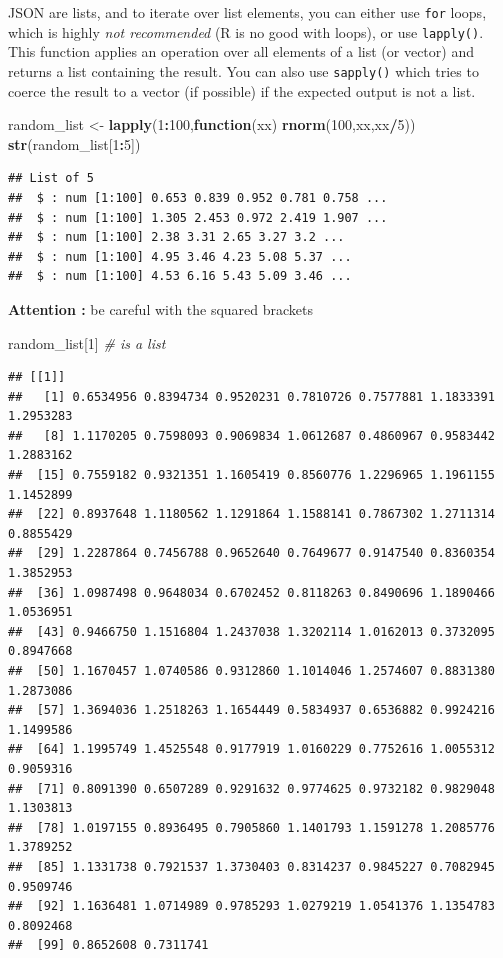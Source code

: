 \documentclass[
]{book}
\newenvironment{Shaded}{\begin{snugshade}}{\end{snugshade}}
\newcommand{\CommentTok}[1]{\textcolor[rgb]{0.56,0.35,0.01}{\textit{#1}}}
\newcommand{\ControlFlowTok}[1]{\textcolor[rgb]{0.13,0.29,0.53}{\textbf{#1}}}
\newcommand{\DecValTok}[1]{\textcolor[rgb]{0.00,0.00,0.81}{#1}}
\newcommand{\KeywordTok}[1]{\textcolor[rgb]{0.13,0.29,0.53}{\textbf{#1}}}
\newcommand{\NormalTok}[1]{#1}
\newcommand{\OperatorTok}[1]{\textcolor[rgb]{0.81,0.36,0.00}{\textbf{#1}}}
\newcommand{\StringTok}[1]{\textcolor[rgb]{0.31,0.60,0.02}{#1}}
\begin{document}
JSON are lists, and to iterate over list elements, you can either use \texttt{for} loops, which is highly \emph{not recommended} (R is no good with loops), or use \texttt{lapply()}. This function applies an operation over all elements of a list (or vector) and returns a list containing the result. You can also use \texttt{sapply()} which tries to coerce the result to a vector (if possible) if the expected output is not a list.

\begin{Shaded}
\begin{Highlighting}[]
\NormalTok{random_list <-}\StringTok{ }\KeywordTok{lapply}\NormalTok{(}\DecValTok{1}\OperatorTok{:}\DecValTok{100}\NormalTok{,}\ControlFlowTok{function}\NormalTok{(xx) }\KeywordTok{rnorm}\NormalTok{(}\DecValTok{100}\NormalTok{,xx,xx}\OperatorTok{/}\DecValTok{5}\NormalTok{))}
\KeywordTok{str}\NormalTok{(random_list[}\DecValTok{1}\OperatorTok{:}\DecValTok{5}\NormalTok{])}
\end{Highlighting}
\end{Shaded}

\begin{verbatim}
## List of 5
##  $ : num [1:100] 0.653 0.839 0.952 0.781 0.758 ...
##  $ : num [1:100] 1.305 2.453 0.972 2.419 1.907 ...
##  $ : num [1:100] 2.38 3.31 2.65 3.27 3.2 ...
##  $ : num [1:100] 4.95 3.46 4.23 5.08 5.37 ...
##  $ : num [1:100] 4.53 6.16 5.43 5.09 3.46 ...
\end{verbatim}

\textbf{Attention :} be careful with the squared brackets

\begin{Shaded}
\begin{Highlighting}[]
\NormalTok{random_list[}\DecValTok{1}\NormalTok{] }\CommentTok{# is a list}
\end{Highlighting}
\end{Shaded}

\begin{verbatim}
## [[1]]
##   [1] 0.6534956 0.8394734 0.9520231 0.7810726 0.7577881 1.1833391 1.2953283
##   [8] 1.1170205 0.7598093 0.9069834 1.0612687 0.4860967 0.9583442 1.2883162
##  [15] 0.7559182 0.9321351 1.1605419 0.8560776 1.2296965 1.1961155 1.1452899
##  [22] 0.8937648 1.1180562 1.1291864 1.1588141 0.7867302 1.2711314 0.8855429
##  [29] 1.2287864 0.7456788 0.9652640 0.7649677 0.9147540 0.8360354 1.3852953
##  [36] 1.0987498 0.9648034 0.6702452 0.8118263 0.8490696 1.1890466 1.0536951
##  [43] 0.9466750 1.1516804 1.2437038 1.3202114 1.0162013 0.3732095 0.8947668
##  [50] 1.1670457 1.0740586 0.9312860 1.1014046 1.2574607 0.8831380 1.2873086
##  [57] 1.3694036 1.2518263 1.1654449 0.5834937 0.6536882 0.9924216 1.1499586
##  [64] 1.1995749 1.4525548 0.9177919 1.0160229 0.7752616 1.0055312 0.9059316
##  [71] 0.8091390 0.6507289 0.9291632 0.9774625 0.9732182 0.9829048 1.1303813
##  [78] 1.0197155 0.8936495 0.7905860 1.1401793 1.1591278 1.2085776 1.3789252
##  [85] 1.1331738 0.7921537 1.3730403 0.8314237 0.9845227 0.7082945 0.9509746
##  [92] 1.1636481 1.0714989 0.9785293 1.0279219 1.0541376 1.1354783 0.8092468
##  [99] 0.8652608 0.7311741
\end{verbatim}
\end{document}
